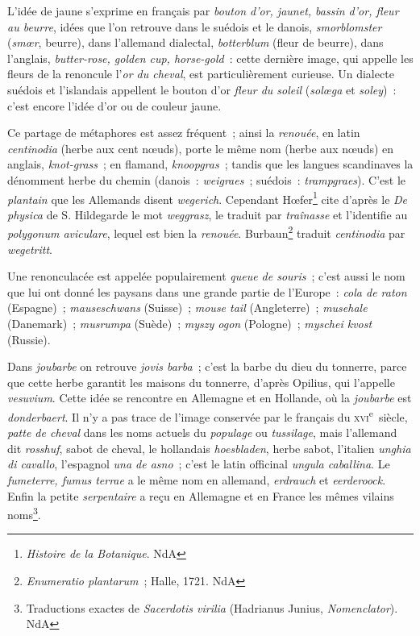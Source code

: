 \documentclass[french,twoside]{book} %
\begin{document}
L’idée de jaune s’exprime en français par {\itshape bouton d’or, jaunet, bassin d’or, fleur au beurre}, idées que l’on retrouve dans le suédois et le danois, {\itshape smorblomster} ({\itshape smœr}, beurre), dans l’allemand dialectal, {\itshape botterblum} (fleur de beurre), dans l’anglais, {\itshape butter-rose, golden cup, horse-gold} : cette dernière image, qui appelle les fleurs de la renoncule l’{\itshape or du cheval}, est particulièrement curieuse. Un dialecte suédois et l’islandais appellent le bouton d’or {\itshape fleur du soleil} ({\itshape solœga} et {\itshape soley}) : c’est encore l’idée d’or ou de couleur jaune.\par
Ce partage de métaphores est assez fréquent ; ainsi la {\itshape renouée}, en latin {\itshape centinodia} (herbe aux cent nœuds), porte le même nom (herbe aux nœuds) en anglais, {\itshape knot-grass} ; en flamand, {\itshape knoopgras} ; tandis que les langues scandinaves la dénomment herbe du chemin (danois : {\itshape weigraes} ; suédois : {\itshape trampgraes}). C’est le {\itshape plantain} que les Allemands disent {\itshape wegerich}. Cependant Hœfer\footnote{ {\itshape Histoire de la Botanique}. NdA} cite d’après le {\itshape De physica} de S. Hildegarde le mot {\itshape weggrasz}, le traduit par {\itshape traînasse} et l’identifie au {\itshape polygonum aviculare}, lequel est bien la {\itshape renouée}. Burbaun\footnote{ {\itshape Enumeratio plantarum} ; Halle, 1721. NdA} traduit {\itshape centinodia} par {\itshape wegetritt}.\par
Une renonculacée est appelée populairement {\itshape queue de souris} ; c’est aussi le nom que lui ont donné les paysans dans une grande partie de l’Europe : {\itshape cola de raton} (Espagne) ; {\itshape mauseschwans} (Suisse) ; {\itshape mouse tail} (Angleterre) ; {\itshape musehale} (Danemark) ; {\itshape musrumpa} (Suède) ; {\itshape myszy ogon} (Pologne) ; {\itshape myschei kvost} (Russie).\par
Dans {\itshape joubarbe} on retrouve {\itshape jovis barba} ; c’est la barbe du dieu du tonnerre, parce que cette herbe garantit les maisons du tonnerre, d’après Opilius, qui l’appelle {\itshape vesuvium}. Cette idée se rencontre en Allemagne et en Hollande, où la {\itshape joubarbe} est {\itshape donderbaert}. Il n’y a pas trace de l’image conservée par le français du \textsc{xvi}\textsuperscript{e} siècle, {\itshape patte de cheval} dans les noms actuels du {\itshape populage} ou {\itshape tussilage}, mais l’allemand dit {\itshape rosshuf}, sabot de cheval, le hollandais {\itshape hoesbladen}, herbe sabot, l’italien {\itshape unghia di cavallo}, l’espagnol {\itshape una de asno} ; c’est le latin officinal {\itshape ungula caballina}. Le {\itshape fumeterre, fumus terrae} a le même nom en allemand, {\itshape erdrauch} et {\itshape eerderoock}. Enfin la petite {\itshape serpentaire} a reçu en Allemagne et en France les mêmes vilains noms\footnote{ Traductions exactes de {\itshape Sacerdotis virilia} (Hadrianus Junius, {\itshape Nomenclator}). NdA}.\par
\end{document}
